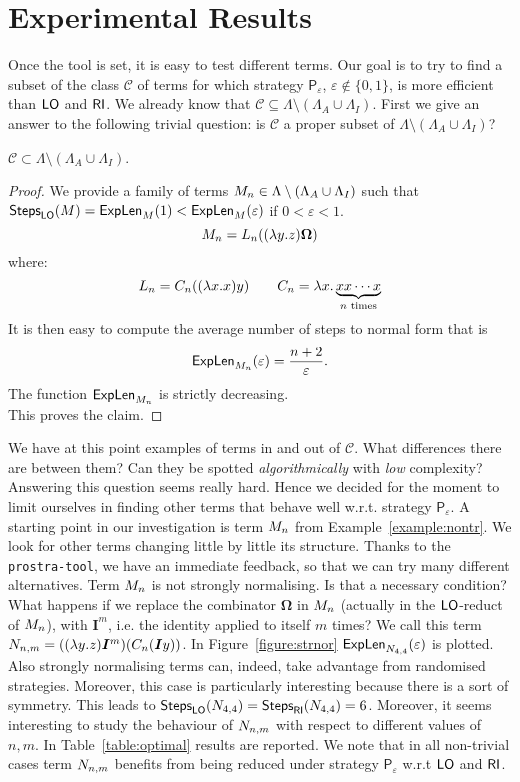 \section{Experimental Results}
Once the tool is set, it is easy to test different terms. Our goal is to try to find a subset of the class $\mathcal{C}$ of terms for which strategy $\mathsf{P}_\varepsilon$, $\varepsilon\not\in\{0,1\}$, is more efficient than $\textsf{LO}$ and $\textsf{RI}$. We already know that $\mathcal{C}\subseteq\Lambda\setminus(\Lambda_A\cup\Lambda_I)$. First we give an answer to the following trivial question: is $\mathcal{C}$ a proper subset of $\Lambda\setminus(\Lambda_A\cup\Lambda_I)$?
\begin{proposition}\label{prop:strict}
	$\mathcal{C}\subset\Lambda\setminus(\Lambda_A\cup\Lambda_I)$.
\end{proposition}
\begin{proof}
	We provide a family of terms $M_n\in\Lambda\setminus(\Lambda_A\cup\Lambda_I)$ such that $\textsf{Steps}_{\textsf{LO}}(M)=\textsf{ExpLen}_{M}(1)<\textsf{ExpLen}_{M}(\varepsilon)$ if $0<\varepsilon<1$.
	$$
	M_n=L_n((\lambda y.z)\bm{\Omega})
	$$
	where:
	$$
	L_n = C_n((\lambda x.x)y)\qquad
	C_n = \lambda  x.\underbrace{xx\cdots x}_{n\text{ times}}
	$$
	It is then easy to compute the average number of steps to normal form that is
	$$
	\textsf{ExpLen}_{M_n}(\varepsilon)=\frac{n+2}{\varepsilon}.
	$$ 
	The function $\textsf{ExpLen}_{M_n}$ is strictly decreasing.\\
	This proves the claim.
\end{proof}
We have at this point examples of terms in and out of $\mathcal{C}$. What differences there are between them? Can they be spotted \emph{algorithmically} with \emph{low} complexity? Answering this question seems really hard. Hence we decided for the moment to limit ourselves in finding other terms that behave well w.r.t. strategy $\mathsf{P}_\varepsilon$. A starting point in our investigation is term $M_n$ from Example~\ref{example:nontr}. We look for other terms changing little by little its structure. Thanks to the \texttt{prostra-tool}, we have an immediate feedback, so that we can try many different alternatives. Term $M_n$ is not strongly normalising. Is that a necessary condition? What happens if we replace the combinator $\bm{\Omega}$ in $M_n$ (actually in the $\textsf{LO}$-reduct of $M_n$), with $\mathbf{I}^m$, i.e. the identity applied to itself $m$ times? We call this term $N_{n,m}=((\lambda y.z)\bm{I}^m) (C_n(\bm{I}y))$. In Figure~\ref{figure:strnor} $\textsf{ExpLen}_{N_{4,4}}(\varepsilon)$ is plotted. Also strongly normalising terms can, indeed, take advantage from randomised strategies. Moreover, this case is particularly interesting because there is a sort of symmetry. This leads to $\textsf{Steps}_{\textsf{LO}}(N_{4,4})=\textsf{Steps}_{\textsf{RI}}(N_{4,4})=6$. Moreover, it seems interesting to study the behaviour of $N_{n,m}$ with respect to different values of $n,m$. In Table~\ref{table:optimal} results are reported. We note that in all non-trivial cases term $N_{n,m}$ benefits from being reduced under strategy $\mathsf{P}_\varepsilon$ w.r.t $\textsf{LO}$ and $\textsf{RI}$.
